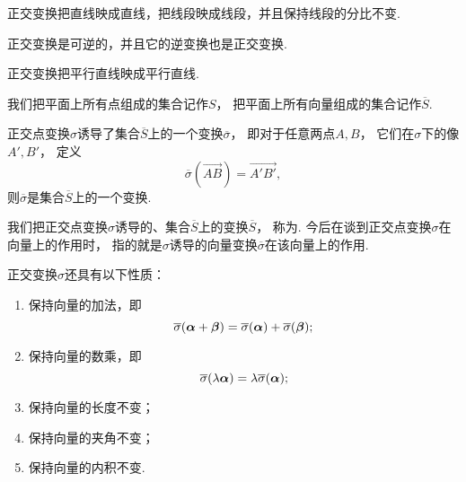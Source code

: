 \begin{property}
正交变换把直线映成直线，把线段映成线段，并且保持线段的分比不变.
\end{property}

\begin{property}
正交变换是可逆的，并且它的逆变换也是正交变换.
\end{property}

\begin{property}
正交变换把平行直线映成平行直线.
\end{property}

我们把平面上所有点组成的集合记作\(S\)，
把平面上所有向量组成的集合记作\(\overline{S}\).
\begin{property}
正交点变换\(\sigma\)诱导了集合\(\overline{S}\)上的一个变换\(\overline{\sigma}\)，
即对于任意两点\(A,B\)，
它们在\(\sigma\)下的像\(A',B'\)，
定义\begin{equation*}
	\overline{\sigma}(\vec{AB}) = \vec{A'B'},
\end{equation*}
则\(\overline{\sigma}\)是集合\(\overline{S}\)上的一个变换.
\end{property}

我们把正交点变换\(\sigma\)诱导的、集合\(\overline{S}\)上的变换\(\overline{S}\)，
称为.
今后在谈到正交点变换\(\sigma\)在向量上的作用时，
指的就是\(\sigma\)诱导的向量变换\(\overline{\sigma}\)在该向量上的作用.

\begin{property}
正交变换\(\sigma\)还具有以下性质：\begin{enumerate}
	\item 保持向量的加法，即\begin{equation*}
		\overline{\sigma}(\boldsymbol\alpha+\boldsymbol\beta)
		= \overline{\sigma}(\boldsymbol\alpha)
		+ \overline{\sigma}(\boldsymbol\beta);
	\end{equation*}

	\item 保持向量的数乘，即\begin{equation*}
		\overline{\sigma}(\lambda \boldsymbol\alpha)
		= \lambda \overline{\sigma}(\boldsymbol\alpha);
	\end{equation*}

	\item 保持向量的长度不变；

	\item 保持向量的夹角不变；

	\item 保持向量的内积不变.
\end{enumerate}
\end{property}


